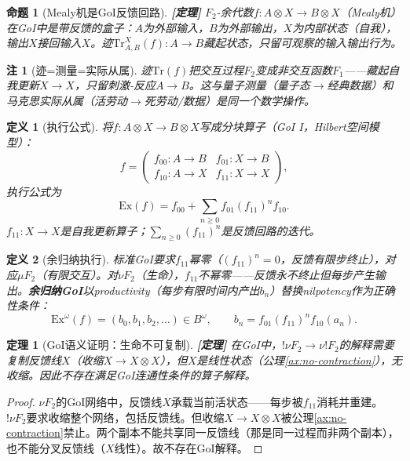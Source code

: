\documentclass[11pt,a4paper]{article}
\newtheorem{definition}{定义}
\newtheorem{theorem}{定理}
\newtheorem{proposition}{命题}
\newtheorem{remark}{注}
\newcommand{\lvl}[1]{\hfill\textbf{\footnotesize[#1]}}
\newcommand{\lvP}{\lvl{定理}}
\newcommand{\bang}{{!}}
\newcommand{\tensor}{\otimes}
\begin{document}
\begin{proposition}[Mealy机是GoI反馈回路]\label{prop:mealy-goi}\lvP
$F_2$-余代数$f:A\tensor X\to B\tensor X$（Mealy机）在GoI中是带反馈的盒子：$A$为外部输入，$B$为外部输出，$X$为内部状态（自我），输出$X$接回输入$X$。迹$\mathrm{Tr}^X_{A,B}(f):A\to B$藏起状态，只留可观察的输入输出行为。
\end{proposition}

\begin{remark}[迹=测量=实际从属]\label{rmk:trace-measurement}
迹$\mathrm{Tr}(f)$把交互过程$F_2$变成非交互函数$F_1$——藏起自我更新$X\to X$，只留刺激-反应$A\to B$。这与量子测量（量子态$\to$经典数据）和马克思实际从属（活劳动$\to$死劳动/数据）是同一个数学操作。
\end{remark}

\begin{definition}[执行公式]\label{def:execution}
将$f:A\tensor X\to B\tensor X$写成分块算子（GoI I，Hilbert空间模型）：
$$f=\begin{pmatrix} f_{00}:A\to B & f_{01}:X\to B\\ f_{10}:A\to X & f_{11}:X\to X\end{pmatrix},$$
执行公式为
$$\mathrm{Ex}(f)=f_{00}+\sum_{n\geq0}f_{01}(f_{11})^n f_{10}.$$
$f_{11}:X\to X$是自我更新算子；$\sum_{n\geq0}(f_{11})^n$是反馈回路的迭代。
\end{definition}

\begin{definition}[余归纳执行]\label{def:coinductive-execution}
标准GoI要求$f_{11}$幂零（$(f_{11})^n=0$，反馈有限步终止），对应$\mu F_2$（有限交互）。对$\nu F_2$（生命），$f_{11}$不幂零——反馈永不终止但每步产生输出。\textbf{余归纳GoI}以productivity（每步有限时间内产出$b_n$）替换nilpotency作为正确性条件：
$$\mathrm{Ex}^\omega(f)=(b_0,b_1,b_2,\ldots)\in B^\omega,\qquad b_n=f_{01}(f_{11})^n f_{10}(a_n).$$
\end{definition}

\begin{theorem}[GoI语义证明：生命不可复制]\label{thm:goi-no-clone}\lvP
在GoI中，$\bang\nu F_2\to\nu\bang F_2$的解释需要复制反馈线$X$（收缩$X\to X\tensor X$），但$X$是线性状态（公理\ref{ax:no-contraction}），无收缩。因此不存在满足GoI连通性条件的算子解释。
\end{theorem}

\begin{proof}
$\nu F_2$的GoI网络中，反馈线$X$承载当前活状态——每步被$f_{11}$消耗并重建。$\bang\nu F_2$要求收缩整个网络，包括反馈线。但收缩$X\to X\tensor X$被公理\ref{ax:no-contraction}禁止。两个副本不能共享同一反馈线（那是同一过程而非两个副本），也不能分叉反馈线（$X$线性）。故不存在GoI解释。
\end{proof}
\end{document}
